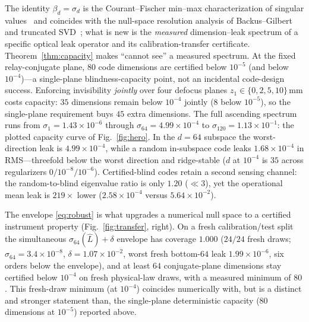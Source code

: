 \documentclass[10pt,twocolumn]{article}
\theoremstyle{plain}
\theoremstyle{definition}
\newcommand{\bd}{\beta}
\newcommand{\Lop}{L}
\begin{document}
The identity $\bd_d=\sigma_d$ is the Courant--Fischer min--max characterization of
singular values~\cite{HornJohnson} and coincides with the null-space resolution
analysis of Backus--Gilbert and truncated SVD~\cite{BackusGilbert}; what is new is
the \emph{measured} dimension--leak spectrum of a specific optical leak operator and
its calibration-transfer certificate. Theorem~\ref{thm:capacity} makes ``cannot see''
a measured spectrum. At the fixed
relay-conjugate plane, $80$ code dimensions are certified below $10^{-5}$ (and
below $10^{-4}$)---a single-plane blindness-capacity point, not an incidental
code-design success. Enforcing invisibility \emph{jointly} over four defocus
planes $z_1\in\{0,2,5,10\}\,$mm costs capacity: $35$ dimensions remain below
$10^{-4}$ jointly ($8$ below $10^{-5}$), so the single-plane requirement buys $45$
extra dimensions. The full ascending spectrum runs from $\sigma_1=1.43\times10^{-6}$
through $\sigma_{64}=4.99\times10^{-4}$ to $\sigma_{120}=1.13\times10^{-1}$: the
plotted capacity curve of Fig.~\ref{fig:hero}. In the $d=64$ subspace the
worst-direction leak is $4.99\times10^{-4}$, while a random in-subspace code leaks
$1.68\times10^{-4}$ in RMS---threefold below the worst direction and ridge-stable
($d$ at $10^{-4}$ is $35$ across regularizers $0/10^{-8}/10^{-6}$). Certified-blind
codes retain a second sensing channel: the random-to-blind eigenvalue ratio is only
$1.20$ ($\ll3$), yet the operational mean leak is $219\times$ lower
($2.58\times10^{-4}$ versus $5.64\times10^{-2}$).

The envelope \eqref{eq:robust} is what upgrades a numerical null space to a
certified instrument property (Fig.~\ref{fig:transfer}, right). On a fresh
calibration/test split the simultaneous $\sigma_{64}(\hat\Lop)+\delta$ envelope has
coverage $1.000$ ($24/24$ fresh draws; $\sigma_{64}=3.4\times10^{-8}$,
$\delta=1.07\times10^{-2}$, worst fresh bottom-$64$ leak $1.99\times10^{-6}$, six
orders below the envelope), and at least $64$ conjugate-plane dimensions stay
certified below $10^{-4}$ on fresh physical-law draws, with a measured minimum of
$80$. This fresh-draw minimum (at $10^{-4}$) coincides numerically with, but is a
distinct and stronger statement than, the single-plane deterministic capacity ($80$
dimensions at $10^{-5}$) reported above.

\end{document}
